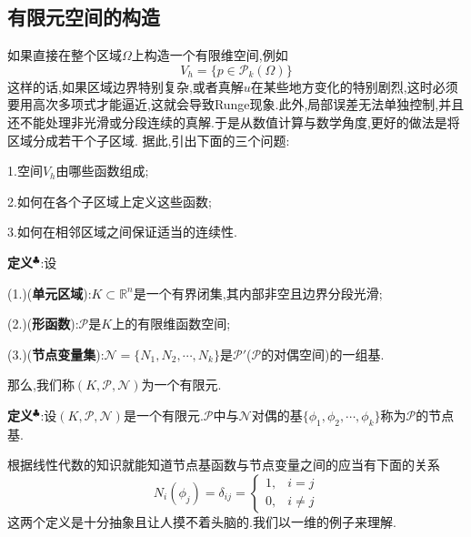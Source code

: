 \subsection{有限元空间的构造}
如果直接在整个区域$\Omega$上构造一个有限维空间,例如
$$
V_h=\{p\in \mathcal{P}_k(\Omega)\}
$$
这样的话,如果区域边界特别复杂,或者真解$u$在某些地方变化的特别剧烈,这时必须要用高次多项式才能逼近,这就会导致Runge现象.此外,局部误差无法单独控制,并且还不能处理非光滑或分段连续的真解.于是从数值计算与数学角度,更好的做法是将区域分成若干个子区域.
据此,引出下面的三个问题:\par
1.空间$V_h$由哪些函数组成;\par
2.如何在各个子区域上定义这些函数;\par
3.如何在相邻区域之间保证适当的连续性.\par
\textbf{定义}$^\clubsuit $:设\par
(1.)(\textbf{单元区域}):$K\subset\mathbb{R}^n$是一个有界闭集,其内部非空且边界分段光滑;\par
(2.)(\textbf{形函数}):$\mathcal{P}$是$K$上的有限维函数空间;\par
(3.)(\textbf{节点变量集}):$\mathcal{N}=\{N_1,N_2,\cdots,N_k\}$是$\mathcal{P}'$($\mathcal{P}$的对偶空间)的一组基.\par
那么,我们称$(K,\mathcal{P},\mathcal{N})$为一个有限元.\par
\textbf{定义}$^\clubsuit $:设$(K,\mathcal{P},\mathcal{N})$是一个有限元.$\mathcal{P}$中与$\mathcal{N}$对偶的基$\{\phi_1,\phi_2,\cdots,\phi_k\}$称为$\mathcal{P}$的节点基.\par
根据线性代数的知识就能知道节点基函数与节点变量之间的应当有下面的关系
$$
N_i(\phi_j)=\delta_{ij}=
\begin{cases}
    1,& i=j\\
    0,&i\neq j
\end{cases}
$$
这两个定义是十分抽象且让人摸不着头脑的.我们以一维的例子来理解.\par
